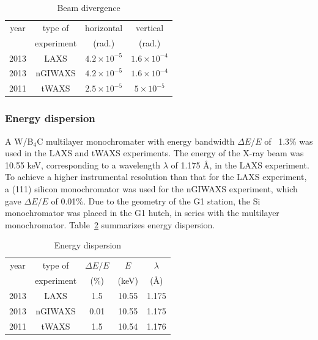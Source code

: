 \begin{table}[htbp]
  \centering
  \begin{tabular}{cccc}
    \hline
    year & type of  & horizontal & vertical \\
     & experiment & (rad.) & (rad.) \\
    \hline
    2013 & LAXS & $4.2 \times 10^{-5}$ & $1.6 \times 10^{-4}$ \\
    2013 & nGIWAXS & $4.2 \times 10^{-5}$ & $1.6 \times 10^{-4}$ \\
    2011 & tWAXS & $2.5 \times 10^{-5}$ & $5 \times 10^{-5}$ \\
    \hline
  \end{tabular}
  \caption[Beam divergence]{Beam divergence}
  \label{tab:beam_divergence}
\end{table}

\subsubsection{Energy dispersion}\label{sec:energy_dispersion}
A W/B$_4$C multilayer monochromater with energy bandwidth $\Delta E$/$E$ of 
~1.3\% was used in the LAXS and tWAXS experiments. 
The energy of the X-ray beam was 10.55 keV, corresponding to a wavelength 
$\lambda$ of 1.175 \AA, in the LAXS experiment.
To achieve a higher instrumental resolution than that for 
the LAXS experiment, a (111) silicon monochromator was used for 
the nGIWAXS experiment, which gave $\Delta E/E$ of 0.01\%.
Due to the geometry of the G1 station, the Si monochromator was placed in
the G1 hutch, in series with the multilayer monochromator. 
Table~\ref{tab:energy_dispersion} summarizes energy dispersion.

\begin{table}[htbp]
  \centering
  \begin{tabular}{ccccc}
    \hline
    year & type of & $\Delta E/E$ & $E$ & $\lambda$ \\
     & experiment & (\%) & (keV) & (\AA) \\
    \hline
    2013 & LAXS & 1.5 & 10.55 & 1.175 \\
    2013 & nGIWAXS & 0.01 & 10.55 & 1.175 \\
    2011 & tWAXS & 1.5 & 10.54 & 1.176 \\
    \hline
  \end{tabular}
  \caption[Energy dispersion]{Energy dispersion}
  \label{tab:energy_dispersion}
\end{table}

